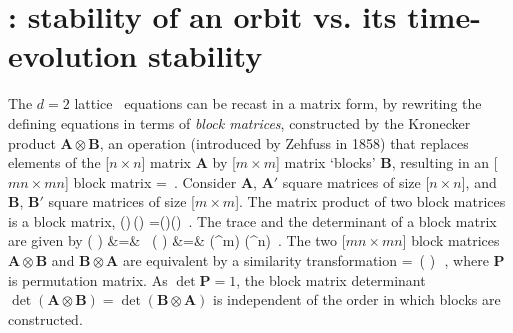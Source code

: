 
\section{{\HillDet}:
            stability of an orbit vs. its time-evolution stability}
\label{s:Hill}

The $d=2$ lattice \catlatt\ equations can be recast in a matrix form, by
rewriting the defining equations in terms of \emph{block
matrices}, constructed by the
 {Kronecker
product} $\mathbf{A}\otimes\mathbf{B}$, an operation
(introduced by Zehfuss in 1858) that replaces
elements of the [$n\times{n}$] matrix $\mathbf{A}$ by [$m\times{m}$]
matrix `blocks' $\mathbf{B}$, resulting in an [$mn\times mn$] block
matrix
\beq
{}\otimes{} =
\,.
Consider $\mathbf{A}$, $\mathbf{A'}$ square matrices of size
[$n\times{n}$], and $\mathbf{B}$, $\mathbf{B'}$ square matrices of size
[$m\times{m}$].
The matrix product of two block matrices is a block
matrix,
\beq
(\otimes{})\,(\otimes{})
  =()\otimes ()
  \,.
The trace and the determinant of a block matrix are given by
\bea
\tr( \otimes {})
    &=& \tr{}\,\tr{}
    \continue
\det\left( \otimes {}\right)
    &=& \det\left(^{m}\right) \det\left(^{n}\right)
\,.
\label{wikiKron2}
\eea
The two [$mn\times mn$] block matrices $\mathbf{A}\otimes\mathbf{B}$ and
$\mathbf{B}\otimes\mathbf{A}$ are equivalent by a similarity
transformation
\beq
{} \otimes {}
= \,( \otimes {} )\,
\,,
where $\mathbf{P}$ is permutation matrix. As $\det{\mathbf{P}}=1$,
the block matrix determinant
$\det\left(\mathbf{A}\otimes\mathbf{B}\right)
=
\det\left(\mathbf{B}\otimes\mathbf{A}\right)$
is independent of the order in which blocks are constructed.

